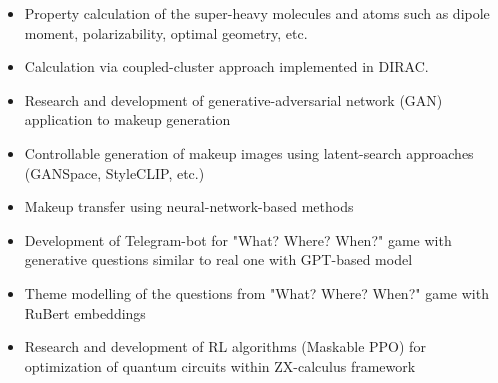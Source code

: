 \begin{itemize}
    \item Property calculation of the super-heavy molecules and atoms such as dipole moment, polarizability, optimal geometry, etc.
    \item Calculation via coupled-cluster approach implemented in DIRAC.
\end{itemize}

\begin{itemize}
    \item Research and development of generative-adversarial network (GAN) application to makeup generation
    \item Controllable generation of makeup images using latent-search approaches (GANSpace, StyleCLIP, etc.)
    \item Makeup transfer using neural-network-based methods
\end{itemize}

\begin{itemize}
    \item Development of Telegram-bot for "What? Where? When?" game with generative questions similar to real one with GPT-based model
    \item Theme modelling of the questions from "What? Where? When?" game with RuBert embeddings
\end{itemize}

\begin{itemize}
    \item Research and development of RL algorithms (Maskable PPO) for optimization of quantum circuits within ZX-calculus framework
\end{itemize}

\cvproject{}